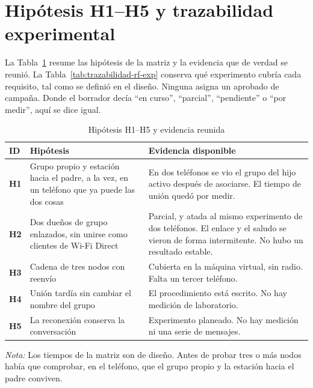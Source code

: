 \documentclass[12pt,oneside]{scrreprt}
\begin{document}
\section{Hipótesis H1--H5 y trazabilidad experimental}

La Tabla~\ref{tab:hipotesis-h1-h5} resume las hipótesis de la matriz y la evidencia que de verdad se reunió. La Tabla~\ref{tab:trazabilidad-rf-exp} conserva qué experimento cubría cada requisito, tal como se definió en el diseño. Ninguna asigna un aprobado de campaña. Donde el borrador decía \enquote{en curso}, \enquote{parcial}, \enquote{pendiente} o \enquote{por medir}, aquí se dice igual.

\begin{table}[H]
\centering
\singlespacing
\caption{Hipótesis H1--H5 y evidencia reunida}
\label{tab:hipotesis-h1-h5}
\renewcommand{\arraystretch}{1.15}
\begin{tabularx}{\textwidth}{@{} >{\raggedright\arraybackslash\bfseries}p{1.1cm} >{\raggedright\arraybackslash}p{6.2cm} X @{}}
\toprule
ID & Hipótesis & Evidencia disponible \\
\midrule
H1 & Grupo propio y estación hacia el padre, a la vez, en un teléfono que ya puede las dos cosas & En dos teléfonos se vio el grupo del hijo activo después de asociarse. El tiempo de unión quedó por medir. \\
H2 & Dos dueños de grupo enlazados, sin unirse como clientes de Wi-Fi Direct & Parcial, y atada al mismo experimento de dos teléfonos. El enlace y el saludo se vieron de forma intermitente. No hubo un resultado estable. \\
H3 & Cadena de tres nodos con reenvío & Cubierta en la máquina virtual, sin radio. Falta un tercer teléfono. \\
H4 & Unión tardía sin cambiar el nombre del grupo & El procedimiento está escrito. No hay medición de laboratorio. \\
H5 & La reconexión conserva la conversación & Experimento planeado. No hay medición ni una serie de mensajes. \\
\bottomrule
\end{tabularx}
\par\vspace{0.2cm}
\small \raggedright \textit{Nota:} Los tiempos de la matriz son de diseño. Antes de probar tres o más nodos había que comprobar, en el teléfono, que el grupo propio y la estación hacia el padre conviven.
\end{table}
\end{document}
